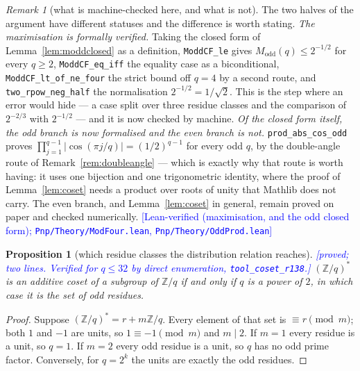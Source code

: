 \documentclass[11pt,a4paper]{article}
\theoremstyle{plain}
\newtheorem{proposition}[theorem]{Proposition}
\theoremstyle{definition}
\theoremstyle{remark}
\newtheorem{remark}[theorem]{Remark}
\newcommand{\Lean}[1]{\texttt{#1}}
\newcommand{\STATUS}[1]{\textcolor{blue}{\textsf{[#1]}}}
\begin{document}
\begin{remark}[what is machine-checked here, and what is not]\label{rem:leanmodfour}
The two halves of the argument have different statuses and the difference is worth stating.
\emph{The maximisation is formally verified.} Taking the closed form of
Lemma~\ref{lem:moddclosed} as a definition, \Lean{ModdCF\_le} gives
$M_{\mathrm{odd}}(q)\le2^{-1/2}$ for every $q\ge2$, \Lean{ModdCF\_eq\_iff} the equality case as
a biconditional, \Lean{ModdCF\_lt\_of\_ne\_four} the strict bound off $q=4$ by a second route,
and \Lean{two\_rpow\_neg\_half} the normalisation $2^{-1/2}=1/\sqrt2$. This is the step where
an error would hide --- a case split over three residue classes and the comparison of
$2^{-2/3}$ with $2^{-1/2}$ --- and it is now checked by machine.
\emph{Of the closed form itself, the odd branch is now formalised and the even branch is not.}
\Lean{prod\_abs\_cos\_odd} proves $\prod_{j=1}^{q-1}|\cos(\pi j/q)|=(1/2)^{q-1}$ for every odd
$q$, by the double-angle route of Remark~\ref{rem:doubleangle} --- which is exactly why that
route is worth having: it uses one bijection and one trigonometric identity, where the proof of
Lemma~\ref{lem:coset} needs a product over roots of unity that Mathlib does not carry. The even
branch, and Lemma~\ref{lem:coset} in general, remain proved on paper and checked numerically.
\STATUS{Lean-verified (maximisation, and the odd closed form);
\texttt{Pnp/Theory/ModFour.lean}, \texttt{Pnp/Theory/OddProd.lean}}
\end{remark}

\begin{proposition}[which residue classes the distribution relation reaches]\label{prop:twopower}
\STATUS{proved; two lines. Verified for $q\le32$ by direct enumeration,
\texttt{tool\_coset\_r138}.}
$(\mathbb{Z}/q)^{*}$ is an additive coset of a subgroup of $\mathbb{Z}/q$ if and only if $q$
is a power of $2$, in which case it is the set of odd residues.
\end{proposition}

\begin{proof}
Suppose $(\mathbb{Z}/q)^{*}=r+m\mathbb{Z}/q$. Every element of that set is $\equiv r\pmod m$;
both $1$ and $-1$ are units, so $1\equiv-1\pmod m$ and $m\mid2$. If $m=1$ every residue is a
unit, so $q=1$. If $m=2$ every odd residue is a unit, so $q$ has no odd prime factor.
Conversely, for $q=2^{k}$ the units are exactly the odd residues.
\end{proof}
\end{document}
